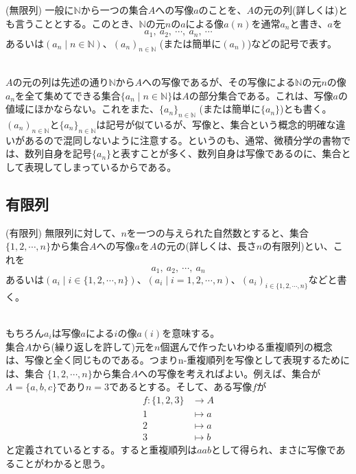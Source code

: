 \documentclass[a4j]{jsarticle}
\begin{document}
\begin{itembox}[l]{ (無限列)}
	一般に$\mathbb{N}$から一つの集合$A$への写像$a$のことを、$A$の元の列(詳しくは)とも言うこととする。このとき、$\mathbb{N}$の元$n$の$a$による像$a(n)$を通常$a_n$と書き、$a$を$$ a_1,\:a_2,\:\cdots,\:a_n,\:\cdots $$あるいは$(a_n \mid n \in \mathbb{N})$、$(a_n)_{n \in \mathbb{N}}$ (または簡単に$(a_n)$)などの記号で表す。
\end{itembox}\\

$A$の元の列は先述の通り$\mathbb{N}$から$A$への写像であるが、その写像による$\mathbb{N}$の元$n$の像$a_n$を全て集めてできる集合$\{a_n \mid n \in \mathbb{N}\}$は$A$の部分集合である。これは、写像$a$の値域にほかならない。これをまた、$\{a_n\}_{n \in \mathbb{N}}$ (または簡単に$\{a_n\}$)とも書く。\\

 $(a_n)_{n \in \mathbb{N}}$と$\{a_n\}_{n \in \mathbb{N}}$は記号が似ているが、写像と、集合という概念的明確な違いがあるので混同しないように注意する。というのも、通常、微積分学の書物では、数列自身を記号$\{a_n\}$と表すことが多く、数列自身は写像であるのに、集合として表現してしまっているからである。

\subsection{有限列}

\begin{itembox}[l]{ (有限列)}
	無限列に対して、$n$を一つの与えられた自然数とすると、集合$\{1,2,\cdots,n\}$から集合$A$への写像$a$を$A$の元の(詳しくは、長さ$n$の有限列)とい、これを$$ a_1,\:a_2,\:\cdots,\:a_n$$あるいは$(a_i \mid i \in \{1,2,\cdots,n\})$、$(a_i \mid i = 1,2,\cdots,n)$、$(a_i)_{i \in \{1,2,\cdots,n\}}$などと書く。
\end{itembox}\\

もちろん$a_i$は写像$a$による$i$の像$a(i)$を意味する。\\

 集合$A$から(繰り返しを許して)元を$n$個選んで作ったいわゆる重複順列の概念は、写像と全く同じものである。つまりn-重複順列を写像として表現するためには、集合
$\{1,2,\cdots,n\}$から集合$A$への写像を考えればよい。例えば、集合が$A=\{a,b,c\}$であり$n=3$であるとする。そして、ある写像$f$が
\begin{align*}
	f : \{1,2,3\} & \rightarrow A \\
	1             & \mapsto a     \\
	2             & \mapsto a     \\
	3             & \mapsto b
\end{align*}
と定義されているとする。すると重複順列は$aab$として得られ、まさに写像であることがわかると思う。
\end{document}
